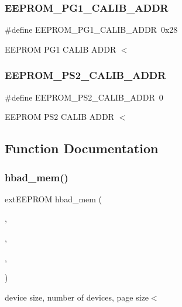 \subsubsection{\texorpdfstring{E\+E\+P\+R\+O\+M\+\_\+\+P\+G1\+\_\+\+C\+A\+L\+I\+B\+\_\+\+A\+D\+DR}{EEPROM\_PG1\_CALIB\_ADDR}}
{\footnotesize\ttfamily \#define E\+E\+P\+R\+O\+M\+\_\+\+P\+G1\+\_\+\+C\+A\+L\+I\+B\+\_\+\+A\+D\+DR~0x28}

E\+E\+P\+R\+OM P\+G1 C\+A\+L\+IB A\+D\+DR $<$ \mbox{\label{group___memory_module_ga71862ebe386984f27bf392b21a44d421}} 
\subsubsection{\texorpdfstring{E\+E\+P\+R\+O\+M\+\_\+\+P\+S2\+\_\+\+C\+A\+L\+I\+B\+\_\+\+A\+D\+DR}{EEPROM\_PS2\_CALIB\_ADDR}}
{\footnotesize\ttfamily \#define E\+E\+P\+R\+O\+M\+\_\+\+P\+S2\+\_\+\+C\+A\+L\+I\+B\+\_\+\+A\+D\+DR~0}

E\+E\+P\+R\+OM P\+S2 C\+A\+L\+IB A\+D\+DR $<$ 

\subsection{Function Documentation}
\mbox{\label{group___memory_module_ga0f8bd3acd0e41754fec8a0b799201f10}} 
\subsubsection{\texorpdfstring{hbad\+\_\+mem()}{hbad\_mem()}}
{\footnotesize\ttfamily ext\+E\+E\+P\+R\+OM hbad\+\_\+mem (\begin{DoxyParamCaption}\item[{kbits\+\_\+256}]{,  }\item[{1}]{,  }\item[{32}]{,  }\item[{\hyperlink{group___memory_module_ga0bb5af400d8883a7a9dc432ad3296546}{E\+E\+P\+R\+O\+M\+\_\+\+I2\+C\+\_\+\+A\+D\+DR}}]{ }\end{DoxyParamCaption})}

device size, number of devices, page size$<$ 